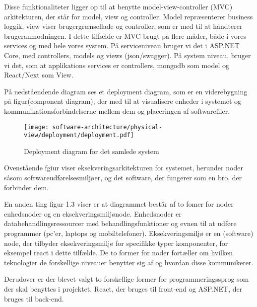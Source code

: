 Disse funktionaliteter ligger op til at benytte model-view-controller (MVC) arkitekturen, der står for model, view og controller. Model repræsenterer business loggik, view viser brugergrænseflade og controller, som er med til at håndterer brugeranmodningen. I dette tilfælde er MVC brugt på flere måder, både i vores services og med hele vores system. På serviceniveau bruger vi det i ASP.NET Core, med controllers, models og views (json/swagger). På system niveau, bruger vi det, som at applikations services er controllers, mongodb som model og React/Next som View.

På nedståendende diagram ses et deployment diagram, som er en viderebygning på figur(component diagram), der med til at visualisere enheder i systemet og kommunikationsforbindelserne mellem dem og placeringen af softwarefiler.


\begin{figure}[ht]
    \centering
\texttt{[image: software-architecture/physical-view/deployment/deployment.pdf]}
\caption{Deployment diagram for det samlede system}
\label{fig:figure2}
\end{figure}

Ovenstående fgiur viser eksekveringsarkitekturen for systemet, herunder noder såsom softwareudførelsesmiljøer, og det software, der fungerer som en bro, der forbinder dem. 

En anden ting figur 1.3 viser er at diagrammet består af to fomer for noder enhedsnoder og en eksekveringsmiljønode. Enhedsnoder er databehandlingsressourcer med behandlingsfunktioner og evnen til at udføre programmer (pc'er, laptops og mobiltelefoner).  Eksekveringsmiljø er en (software) node, der tilbyder eksekveringsmiljø for specifikke typer komponenter, for eksempel react i dette tilfælde. De to former for noder fortæller om hvilken teknologier de forskellige niveauer benytter sig af og hvordan disse kommunikerer.

Derudover er der blevet valgt to forskellige former for programmeringssprog som der skal benyttes i projektet. React, der bruges til front-end og ASP.NET, der bruges til back-end. 



